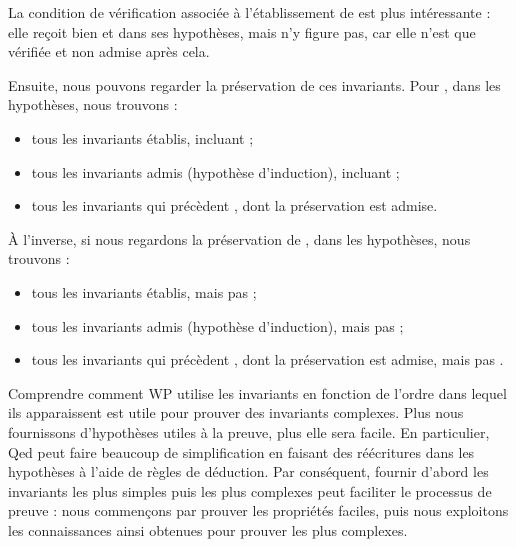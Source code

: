 

La condition de vérification associée à l'établissement de  est
plus intéressante : elle reçoit bien  et  dans
ses hypothèses, mais  n'y figure pas, car elle n'est que vérifiée
et non admise après cela.




Ensuite, nous pouvons regarder la préservation de ces invariants. Pour
, dans les hypothèses, nous trouvons :
\begin{itemize}
  \item tous les invariants établis, incluant  ;
  \item tous les invariants admis (hypothèse d'induction), incluant  ;
  \item tous les invariants qui précèdent , dont la préservation est admise.
\end{itemize}




À l'inverse, si nous regardons la préservation de , dans les
hypothèses, nous trouvons :
\begin{itemize}
  \item tous les invariants établis, mais pas  ;
  \item tous les invariants admis (hypothèse d'induction), mais pas  ;
  \item tous les invariants qui précèdent , dont la préservation
        est admise, mais pas .
\end{itemize}




Comprendre comment WP utilise les invariants en fonction de l'ordre
dans lequel ils apparaissent est utile pour prouver des invariants complexes.
Plus nous fournissons d'hypothèses utiles à la preuve, plus elle sera facile.
En particulier, Qed peut faire beaucoup de simplification en faisant des
réécritures dans les hypothèses à l'aide de règles de déduction. Par conséquent,
fournir d'abord les invariants les plus simples puis les plus complexes peut
faciliter le processus de preuve : nous commençons par prouver les propriétés
faciles, puis nous exploitons les connaissances ainsi obtenues pour prouver les
plus complexes.





